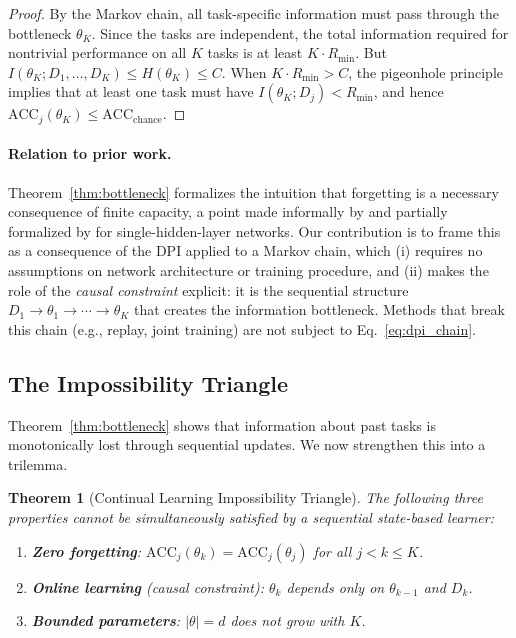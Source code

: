 \documentclass{article}
\newtheorem{theorem}{Theorem}
\begin{document}
\begin{proof}
By the Markov chain, all task-specific information must pass through the bottleneck $\theta_K$. Since the tasks are independent, the total information required for nontrivial performance on all $K$ tasks is at least $K \cdot R_\mathrm{min}$. But $I(\theta_K; D_1, \ldots, D_K) \leq H(\theta_K) \leq C$. When $K \cdot R_\mathrm{min} > C$, the pigeonhole principle implies that at least one task must have $I(\theta_K; D_j) < R_\mathrm{min}$, and hence $\mathrm{ACC}_j(\theta_K) \leq \mathrm{ACC}_\mathrm{chance}$.
\end{proof}

\paragraph{Relation to prior work.} Theorem~\ref{thm:bottleneck} formalizes the intuition that forgetting is a necessary consequence of finite capacity, a point made informally by \citet{french1999catastrophic} and partially formalized by \citet{taheri2025forgetting} for single-hidden-layer networks. Our contribution is to frame this as a consequence of the DPI applied to a Markov chain, which (i) requires no assumptions on network architecture or training procedure, and (ii) makes the role of the \emph{causal constraint} explicit: it is the sequential structure $D_1 \to \theta_1 \to \cdots \to \theta_K$ that creates the information bottleneck. Methods that break this chain (e.g., replay, joint training) are not subject to Eq.~\eqref{eq:dpi_chain}.


\subsection{The Impossibility Triangle}
\label{sec:impossibility}

Theorem~\ref{thm:bottleneck} shows that information about past tasks is monotonically lost through sequential updates. We now strengthen this into a trilemma.

\begin{theorem}[Continual Learning Impossibility Triangle]
\label{thm:impossibility}
The following three properties cannot be simultaneously satisfied by a sequential state-based learner:
\begin{enumerate}
    \item \textbf{Zero forgetting}: $\mathrm{ACC}_j(\theta_k) = \mathrm{ACC}_j(\theta_j)$ for all $j < k \leq K$.
    \item \textbf{Online learning} (causal constraint): $\theta_k$ depends only on $\theta_{k-1}$ and $D_k$.
    \item \textbf{Bounded parameters}: $|\theta| = d$ does not grow with $K$.
\end{enumerate}
\end{theorem}
\end{document}
